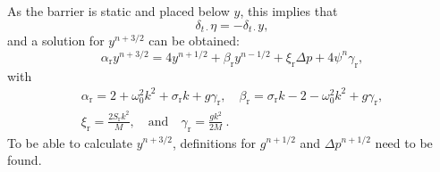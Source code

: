 As the barrier is static and placed below $y$, this implies that
\begin{equation}\label{eq:etaNegY} 
    \delta_{t\cdot}\eta = -\delta_{t\cdot}y,
\end{equation}
and a solution for $y^{n+3/2}$ can be obtained:
\begin{equation}\label{eq:lipUpdateWithCollision}
    \alpha_\text{r}y^{n+3/2} = 4 y^{n+1/2} + \beta_\text{r}y^{n-1/2} + \xi_\text{r}\Delta p + 4\psi^n\gamma_\text{r},
\end{equation}
with
\begin{gather}
    \alpha_\text{r} = 2 + \omega_0^2 k^2 + \sigma_\text{r} k + g\gamma_\text{r}, \quad \beta_\text{r} = \sigma_\text{r}k - 2 - \omega_0^2k^2 + g\gamma_\text{r}, \nonumber \\[10pt]
    \xi_\text{r} = \frac{2S_\text{r}k^2}{M}, \quad \text{and} \quad \gamma_\text{r} = \frac{gk^2}{2M}\ .\nonumber
\end{gather}
To be able to calculate $y^{n+3/2}$, definitions for $g^{n+1/2}$ and $\Delta p^{n+1/2}$ need to be found. 

